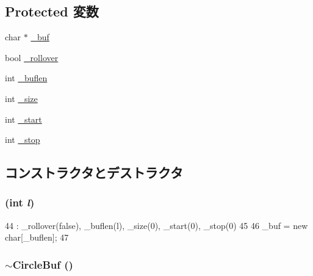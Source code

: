 \subsection*{Protected 変数}
\begin{DoxyCompactItemize}
\item 
char $\ast$ \hyperlink{classCircleBuf_a171b0ba0bac75f8ed2daaf76db929931}{\_\-buf}
\item 
bool \hyperlink{classCircleBuf_abb2cb011de6ab8624161c6ac6fbd49f8}{\_\-rollover}
\item 
int \hyperlink{classCircleBuf_a946c68b8ac85188df76f904b65bb2c21}{\_\-buflen}
\item 
int \hyperlink{classCircleBuf_aaa6c8c862a2c0bc18c802314cc58961d}{\_\-size}
\item 
int \hyperlink{classCircleBuf_aea5c93b4bb6fe666b13e46b84db33233}{\_\-start}
\item 
int \hyperlink{classCircleBuf_afe79e6847d4f6bee712af4da0425e962}{\_\-stop}
\end{DoxyCompactItemize}


\subsection{コンストラクタとデストラクタ}
\hypertarget{classCircleBuf_af891350dcd605da7c72c31ef7f5d6fa8}{
\subsubsection[{CircleBuf}]{ (int {\em l})}}
\label{classCircleBuf_af891350dcd605da7c72c31ef7f5d6fa8}



\begin{DoxyCode}
44     : _rollover(false), _buflen(l), _size(0), _start(0), _stop(0)
45 {
46     _buf = new char[_buflen];
47 }
\end{DoxyCode}
\hypertarget{classCircleBuf_a4b75d682afe5fefd7d4333f411379e20}{
\subsubsection[{$\sim$CircleBuf}]{\setlength{\rightskip}{0pt plus 5cm}$\sim${\bf CircleBuf} ()}}
\label{classCircleBuf_a4b75d682afe5fefd7d4333f411379e20}



